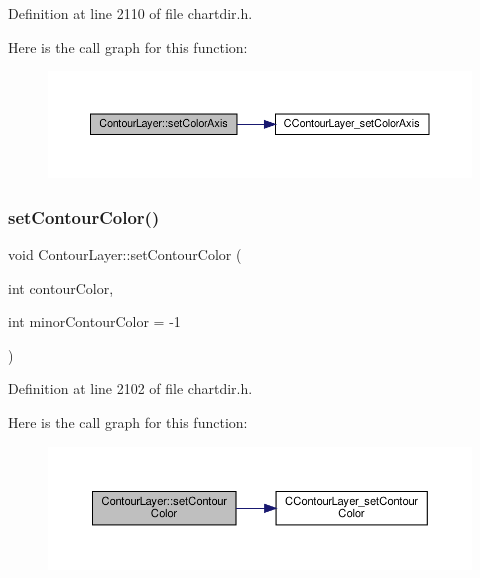Definition at line 2110 of file chartdir.\+h.

Here is the call graph for this function\+:
\nopagebreak
\begin{figure}[H]
\begin{center}
\leavevmode
\includegraphics[width=350pt]{class_contour_layer_a4ca46ccb1a8011f8e9ac33a42efcdf34_cgraph}
\end{center}
\end{figure}
\mbox{\label{class_contour_layer_a07bfa5eda9372670326d4810262f907f}} 
\subsubsection{\texorpdfstring{set\+Contour\+Color()}{setContourColor()}}
{\footnotesize\ttfamily void Contour\+Layer\+::set\+Contour\+Color (\begin{DoxyParamCaption}\item[{int}]{contour\+Color,  }\item[{int}]{minor\+Contour\+Color = {\ttfamily -\/1} }\end{DoxyParamCaption})\hspace{0.3cm}{\ttfamily [inline]}}



Definition at line 2102 of file chartdir.\+h.

Here is the call graph for this function\+:
\nopagebreak
\begin{figure}[H]
\begin{center}
\leavevmode
\includegraphics[width=350pt]{class_contour_layer_a07bfa5eda9372670326d4810262f907f_cgraph}
\end{center}
\end{figure}
\mbox{\label{class_contour_layer_a66ed82e9a4f37eae9bde3e3e787cfd15}} 
